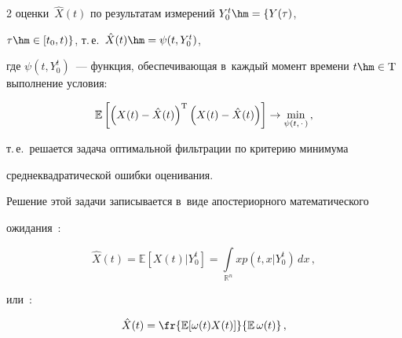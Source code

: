\begin{multicols}{2}
оценки~$\hat X(t)$ по результатам измерений $Y_0^t \hm= \{Y(\tau)$,

$ \tau \hm\in [t_0,t) \}$, т.\,е.\ $\hat X(t)\hm = \psi(t,Y_0^t)$, 

где $\psi(t,Y_0^t)$~--- функция, обеспечивающая в~каждый момент времени $t \hm\in 

\mathrm{T}$ выполнение условия:



\vspace*{2pt}



\noindent

$$

  \mathbb{E} \left[ \left( X(t) - \hat X(t) \right)^\trans \left( X(t) - \hat X(t) \right) 

  \right] \rightarrow \min\limits_{\psi(t, \, \cdot \, )}\,,

$$



\vspace*{-2pt}



\noindent

т.\,е.\ решается задача оптимальной фильтрации по критерию минимума 

среднеквадратической ошибки оценивания.



Решение этой задачи записывается в~виде апостериорного математического 

ожидания~\cite{Sin_07}:



\vspace*{2pt}



\noindent

$$

  \hat X(t) = \mathbb{E} \left[ 

  X(t) | Y_0^t \right] = \int\limits_{\mathds{R}^n} x p(t,x|Y_0^t) \,dx\,,

$$





\noindent

или~\cite{BaiCri_09}:

\begin{equation}

\label{eqParticleEstimation}

  \hat X(t) = \fr{\mathbb{E}[\omega(t) X(t)]}{\mathbb{E} \, \omega(t)}\,,

\end{equation}


\end{multicols}
